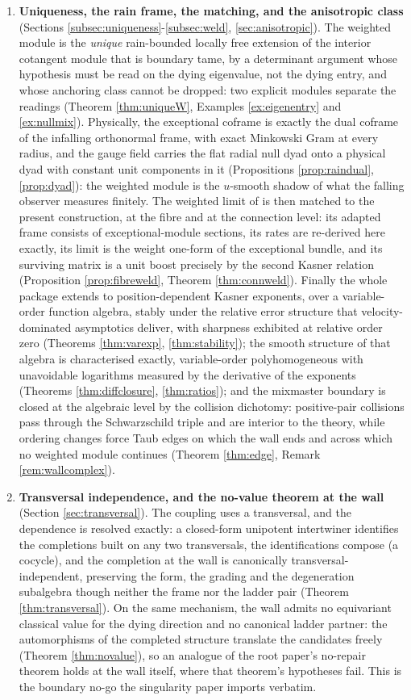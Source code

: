 \documentclass[11pt]{article}
\theoremstyle{definition}
\begin{document}
\begin{enumerate}
\item \textbf{Uniqueness, the rain frame, the matching, and the anisotropic class} (Sections \ref{subsec:uniqueness}-\ref{subsec:weld}, \ref{sec:anisotropic}). The weighted module is the \emph{unique} rain-bounded locally free extension of the interior cotangent module that is boundary tame, by a determinant argument whose hypothesis must be read on the dying eigenvalue, not the dying entry, and whose anchoring class cannot be dropped: two explicit modules separate the readings (Theorem \ref{thm:uniqueW}, Examples \ref{ex:eigenentry} and \ref{ex:nullmix}). Physically, the exceptional coframe is exactly the dual coframe of the infalling orthonormal frame, with exact Minkowski Gram at every radius, and the gauge field carries the flat radial null dyad onto a physical dyad with constant unit components in it (Propositions \ref{prop:raindual}, \ref{prop:dyad}): the weighted module is the $u$-smooth shadow of what the falling observer measures finitely. The weighted limit of \cite{ButlerT6} is then matched to the present construction, at the fibre and at the connection level: its adapted frame consists of exceptional-module sections, its rates are re-derived here exactly, its limit is the weight one-form of the exceptional bundle, and its surviving matrix is a unit boost precisely by the second Kasner relation (Proposition \ref{prop:fibreweld}, Theorem \ref{thm:connweld}). Finally the whole package extends to position-dependent Kasner exponents, over a variable-order function algebra, stably under the relative error structure that velocity-dominated asymptotics deliver, with sharpness exhibited at relative order zero (Theorems \ref{thm:varexp}, \ref{thm:stability}); the smooth structure of that algebra is characterised exactly, variable-order polyhomogeneous with unavoidable logarithms measured by the derivative of the exponents (Theorems \ref{thm:diffclosure}, \ref{thm:ratios}); and the mixmaster boundary is closed at the algebraic level by the collision dichotomy: positive-pair collisions pass through the Schwarzschild triple and are interior to the theory, while ordering changes force Taub edges on which the wall ends and across which no weighted module continues (Theorem \ref{thm:edge}, Remark \ref{rem:wallcomplex}).
\item \textbf{Transversal independence, and the no-value theorem at the wall} (Section \ref{sec:transversal}). The coupling uses a transversal, and the dependence is resolved exactly: a closed-form unipotent intertwiner identifies the completions built on any two transversals, the identifications compose (a cocycle), and the completion at the wall is canonically transversal-independent, preserving the form, the grading and the degeneration subalgebra though neither the frame nor the ladder pair (Theorem \ref{thm:transversal}). On the same mechanism, the wall admits no equivariant classical value for the dying direction and no canonical ladder partner: the automorphisms of the completed structure translate the candidates freely (Theorem \ref{thm:novalue}), so an analogue of the root paper's no-repair theorem holds at the wall itself, where that theorem's hypotheses fail. This is the boundary no-go the singularity paper imports verbatim.
\end{enumerate}
\end{document}
